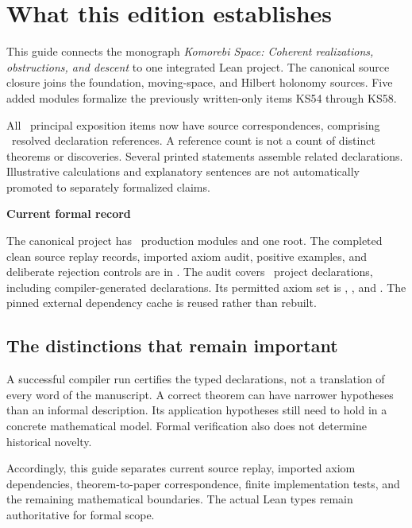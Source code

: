 \documentclass[11pt]{article}
\begin{document}
\KomorebiCover
\section*{What this edition establishes}
This guide connects the monograph \emph{Komorebi Space: Coherent realizations, obstructions, and descent} to one integrated Lean project. The canonical source closure joins the foundation, moving-space, and Hilbert holonomy sources. Five added modules formalize the previously written-only items KS54 through KS58.

All \EditionClaims\ principal exposition items now have source correspondences, comprising \EditionReferences\ resolved declaration references. A reference count is not a count of distinct theorems or discoveries. Several printed statements assemble related declarations. Illustrative calculations and explanatory sentences are not automatically promoted to separately formalized claims.

\begin{scopebox}
\textbf{Current formal record}\par
The canonical project has \EditionFormalModules\ production modules and one root. The completed clean source replay records, imported axiom audit, positive examples, and deliberate rejection controls are in . The audit covers \EditionAuditedDeclarations\ project declarations, including compiler-generated declarations. Its permitted axiom set is , , and . The pinned external dependency cache is reused rather than rebuilt.
\end{scopebox}

\subsection*{The distinctions that remain important}
A successful compiler run certifies the typed declarations, not a translation of every word of the manuscript. A correct theorem can have narrower hypotheses than an informal description. Its application hypotheses still need to hold in a concrete mathematical model. Formal verification also does not determine historical novelty.

Accordingly, this guide separates current source replay, imported axiom dependencies, theorem-to-paper correspondence, finite implementation tests, and the remaining mathematical boundaries. The actual Lean types remain authoritative for formal scope.
\end{document}
